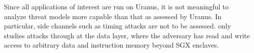 Since all applications of interest are run on Uranus,
it is not meaningful to analyze threat models more capable than that as assessed by Uranus.
In particular, side channels such as timing attacks are not to be assessed.
\pname{} only studies attacks through at the data layer,
where the adversary has read and write access
to arbitrary data and instruction memory beyond SGX enclaves.
